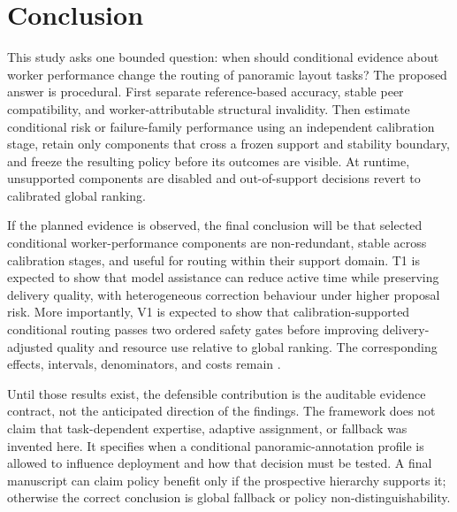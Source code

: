 \section{Conclusion}
\label{sec:conclusion}

This study asks one bounded question: when should conditional evidence about worker performance change the routing of panoramic layout tasks? The proposed answer is procedural. First separate reference-based accuracy, stable peer compatibility, and worker-attributable structural invalidity. Then estimate conditional risk or failure-family performance using an independent calibration stage, retain only components that cross a frozen support and stability boundary, and freeze the resulting policy before its outcomes are visible. At runtime, unsupported components are disabled and out-of-support decisions revert to calibrated global ranking.

\expectedresult{} If the planned evidence is observed, the final conclusion will be that selected conditional worker-performance components are non-redundant, stable across calibration stages, and useful for routing within their support domain. T1 is expected to show that model assistance can reduce active time while preserving delivery quality, with heterogeneous correction behaviour under higher proposal risk. More importantly, V1 is expected to show that calibration-supported conditional routing passes two ordered safety gates before improving delivery-adjusted quality and resource use relative to global ranking. The corresponding effects, intervals, denominators, and costs remain \tbddata{}.

Until those results exist, the defensible contribution is the auditable evidence contract, not the anticipated direction of the findings. The framework does not claim that task-dependent expertise, adaptive assignment, or fallback was invented here. It specifies when a conditional panoramic-annotation profile is allowed to influence deployment and how that decision must be tested. A final manuscript can claim policy benefit only if the prospective hierarchy supports it; otherwise the correct conclusion is global fallback or policy non-distinguishability.

